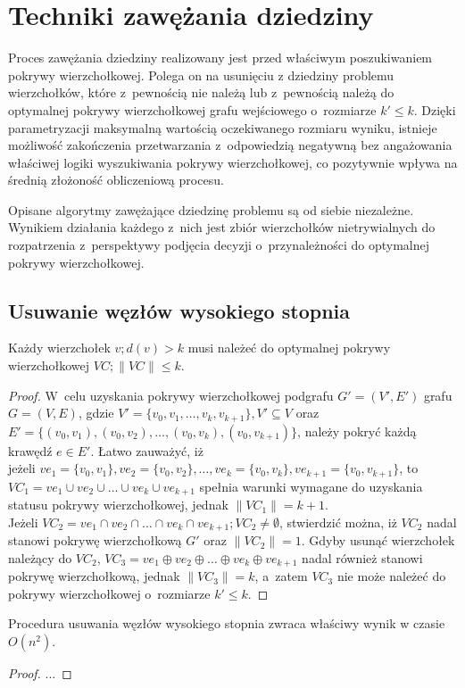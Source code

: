 \section{Techniki zawężania dziedziny}\label{Section_kernelization}

Proces zawężania dziedziny realizowany jest przed właściwym poszukiwaniem
pokrywy wierzchołkowej. Polega on na usunięciu z dziedziny problemu
wierzchołków, które z~pewnością nie należą lub z~pewnością należą do optymalnej
pokrywy wierzchołkowej grafu wejściowego o~rozmiarze $k\prime \leq k$.
Dzięki parametryzacji maksymalną wartością oczekiwanego rozmiaru wyniku,
istnieje możliwość zakończenia przetwarzania z~odpowiedzią negatywną bez
angażowania właściwej logiki wyszukiwania pokrywy wierzchołkowej, co pozytywnie
wpływa na średnią złożoność obliczeniową procesu.

Opisane algorytmy zawężające dziedzinę problemu są od siebie niezależne.
Wynikiem działania każdego z~nich jest zbiór wierzchołków nietrywialnych do
rozpatrzenia z~perspektywy podjęcia decyzji o~przynależności do optymalnej
pokrywy wierzchołkowej.

\subsection{Usuwanie węzłów wysokiego stopnia}\label{section_kernelization_high-degree}

\begin{theorem}
  Każdy wierzchołek $v; d(v) > k $ musi należeć do optymalnej pokrywy wierzchołkowej 
  $VC; \|VC\| \leq k$.
\end{theorem}
\begin{proof}
  W~celu uzyskania pokrywy wierzchołkowej podgrafu $G\prime=(V\prime,E\prime)$
  grafu $G=(V,E)$, gdzie $V\prime=\{v_0, v_1, \ldots, v_k, v_{k+1}\}, V\prime
  \subseteq V$ oraz \\
  $E\prime=\{(v_0,v_1), (v_0,v_2), \ldots, (v_0, v_k), (v_0,v_{k+1})\}$,
  należy pokryć każdą krawędź $e \in E\prime$.
  Łatwo zauważyć, iż \\ jeżeli $ve_1=\{v_0,v_1\}, ve_2=\{v_0,v_2\}, \ldots,
  ve_k=\{v_0,v_k\},ve_{k+1}=\{v_0,v_{k+1}\}$,
  to ${VC_1=ve_1 \cup ve_2 \cup \ldots \cup ve_k \cup ve_{k+1}}$ spełnia warunki 
  wymagane do uzyskania statusu pokrywy wierzchołkowej, jednak $\|VC_1\| = k +1$.\\
  Jeżeli $VC_2=ve_1 \cap ve_2 \cap \ldots \cap ve_k \cap ve_{k+1}; VC_2 \neq \emptyset$,
  stwierdzić można, iż $VC_2$ nadal stanowi pokrywę wierzchołkową $G\prime$ oraz
  $\|VC_2\|=1$.
  Gdyby usunąć wierzchołek należący do $VC_2$, $VC_3=ve_1 \oplus ve_2 \oplus \ldots \oplus ve_k \oplus ve_{k+1}$ nadal
  również stanowi pokrywę wierzchołkową, jednak $\|VC_3\|=k$, a~zatem $VC_3$ nie
  może należeć do pokrywy wierzchołkowej o~rozmiarze $k\prime \leq k$.
\end{proof}

\begin{theorem}
  Procedura usuwania węzłów wysokiego stopnia zwraca właściwy wynik w czasie
  $O(n^2)$.
\end{theorem}
\begin{proof}
  ...
\end{proof}
